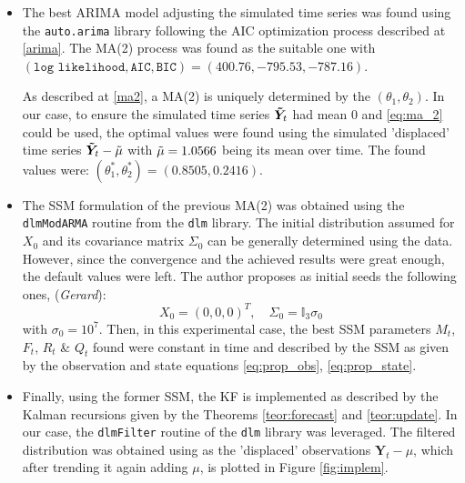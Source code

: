 \documentclass{article}
\theoremstyle{definition}
\theoremstyle{definition}
\theoremstyle{remark}
\theoremstyle{mythmstyle}
\begin{document}
\begin{itemize}
    \item The best ARIMA model adjusting the simulated time series was found using the \texttt{auto.arima} library following the AIC optimization process described at \ref{arima}. The MA(2) process was found as the suitable one with $(\texttt{log likelihood}, \texttt{AIC}, \texttt{BIC}) = (400.76, -795.53, -787.16)$. 

    As described at \ref{ma2}, a MA(2) is uniquely determined by the $(\theta_1, \theta_2)$. In our case, to ensure the simulated time series $\bm{\Tilde{Y}}_t$ had mean $0$ and \eqref{eq:ma_2} could be used, the optimal values were found using the simulated 'displaced' time series $\bm{\Tilde{Y}}_t - \Tilde{\mu}$ with $\Tilde{\mu} =1.0566$ being its mean over time. The found values were: $(\theta_1^*, \theta_2^*)=(0.8505, 0.2416)$.
    \item The SSM formulation of the previous MA(2) was obtained using the \texttt{dlmModARMA} routine from the \texttt{dlm} library. The initial distribution assumed for $X_0$ and its covariance matrix $\Sigma_0$ can be generally determined using the data. However, since the convergence and the achieved results were great enough, the default values were left. The author proposes as initial seeds the following ones, \cite{dlm} (\textit{Gerard}):
    \begin{equation}\label{eq:initials_exp}
         X_0 = ( 0, 0, 0)^T, \quad \Sigma_0 = \mathbb{I}_3 \sigma_0     
    \end{equation} with $\sigma_0 = 10^7$. 
    Then, in this experimental case, the best SSM parameters $M_t$, $F_t$, $R_t$ \& $Q_t$ found were constant in time and described by the SSM as given by the observation and state equations \ref{eq:prop_obs}, \ref{eq:prop_state}. 
    \item Finally, using the former SSM, the KF is implemented as described by the Kalman recursions given by the Theorems \ref{teor:forecast} and \ref{teor:update}. In our case, the \texttt{dlmFilter} routine of the \texttt{dlm} library was leveraged. The filtered distribution was obtained using as the 'displaced' observations $\bm{Y}_t - \mu $, which after trending it again adding $\mu$, is plotted in Figure \ref{fig:implem}.
\end{itemize}
\end{document}
